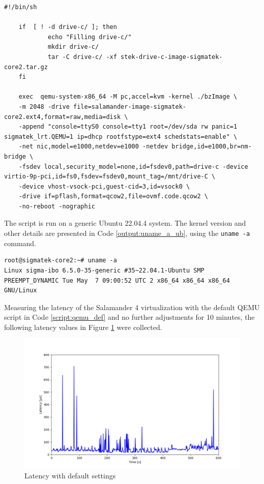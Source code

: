 \documentclass[MMR,Master,english]{twbook}
\begin{document}
\vspace{1em}
\begin{minipage}{\linewidth}
	\begin{lstlisting}[name={QEMU script for starting Salamander 4 virtualisation},label={script:qemu_def}]
    #!/bin/sh

    if  [ ! -d drive-c/ ]; then
            echo "Filling drive-c/"
            mkdir drive-c/
            tar -C drive-c/ -xf stek-drive-c-image-sigmatek-core2.tar.gz
    fi
    
    exec  qemu-system-x86_64 -M pc,accel=kvm -kernel ./bzImage \
    -m 2048 -drive file=salamander-image-sigmatek-core2.ext4,format=raw,media=disk \
    -append "console=ttyS0 console=tty1 root=/dev/sda rw panic=1 sigmatek_lrt.QEMU=1 ip=dhcp rootfstype=ext4 schedstats=enable" \
    -net nic,model=e1000,netdev=e1000 -netdev bridge,id=e1000,br=nm-bridge \
    -fsdev local,security_model=none,id=fsdev0,path=drive-c -device virtio-9p-pci,id=fs0,fsdev=fsdev0,mount_tag=/mnt/drive-C \
    -device vhost-vsock-pci,guest-cid=3,id=vsock0 \
    -drive if=pflash,format=qcow2,file=ovmf.code.qcow2 \
    -no-reboot -nographic
\end{lstlisting}
\end{minipage}

\noindent The script is run on a generic Ubuntu 22.04.4 system. The kernel version and other details are presented in Code \ref{output:uname_a_ub}, using the \texttt{uname -a} command.

\vspace{1em}
\begin{minipage}{0.95\columnwidth}
	\begin{lstlisting}[name={Ubuntu 22.04.4 system information},label={output:uname_a_ub}]
root@sigmatek-core2:~# uname -a 
Linux sigma-ibo 6.5.0-35-generic #35~22.04.1-Ubuntu SMP PREEMPT_DYNAMIC Tue May  7 09:00:52 UTC 2 x86_64 x86_64 x86_64 GNU/Linux
\end{lstlisting}
\end{minipage}

\noindent Measuring the latency of the Salamander 4 virtualization with the default QEMU script in Code \ref{script:qemu_def} and no further adjustments for 10 minutes, the following latency values in Figure \ref{fig:max_latency_default} were collected. 

\begin{figure}[H]
	\centering
	\includegraphics[width=0.75\columnwidth]{img/max_latency_default.png}
	\caption[Latency with default settings]{Latency with default settings}
	\label{fig:max_latency_default}
\end{figure}
\end{document}
